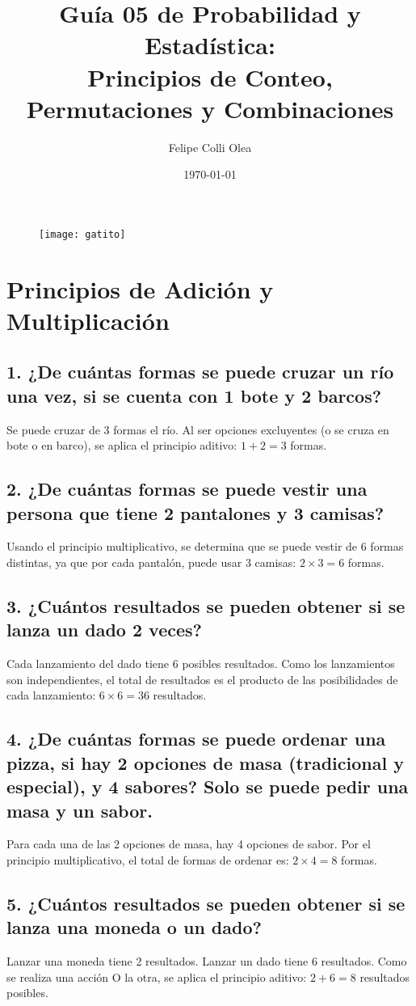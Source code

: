 \documentclass[11pt]{article}
\title{Guía 05 de Probabilidad y Estadística: \\ Principios de Conteo, Permutaciones y Combinaciones}
\author{Felipe Colli Olea}
\date{\today}
\begin{document}
\maketitle
\begin{figure}[h!]
    \centering
    \texttt{[image: gatito]}
\end{figure}
\tableofcontents
\newpage

\section{Principios de Adición y Multiplicación}
    \subsection*{1. ¿De cuántas formas se puede cruzar un río una vez, si se cuenta con 1 bote y 2 barcos?}
    Se puede cruzar de 3 formas el río. Al ser opciones excluyentes (o se cruza en bote o en barco), se aplica el principio aditivo: $1 + 2 = 3$ formas.

    \subsection*{2. ¿De cuántas formas se puede vestir una persona que tiene 2 pantalones y 3 camisas?}
    Usando el principio multiplicativo, se determina que se puede vestir de 6 formas distintas, ya que por cada pantalón, puede usar 3 camisas: $2 \times 3 = 6$ formas.

    \subsection*{3. ¿Cuántos resultados se pueden obtener si se lanza un dado 2 veces?}
    Cada lanzamiento del dado tiene 6 posibles resultados. Como los lanzamientos son independientes, el total de resultados es el producto de las posibilidades de cada lanzamiento: $6 \times 6 = 36$ resultados.

    \subsection*{4. ¿De cuántas formas se puede ordenar una pizza, si hay 2 opciones de masa (tradicional y especial), y 4 sabores? Solo se puede pedir una masa y un sabor.}
    Para cada una de las 2 opciones de masa, hay 4 opciones de sabor. Por el principio multiplicativo, el total de formas de ordenar es: $2 \times 4 = 8$ formas.

    \subsection*{5. ¿Cuántos resultados se pueden obtener si se lanza una moneda o un dado?}
    Lanzar una moneda tiene 2 resultados. Lanzar un dado tiene 6 resultados. Como se realiza una acción O la otra, se aplica el principio aditivo: $2 + 6 = 8$ resultados posibles.
\end{document}
